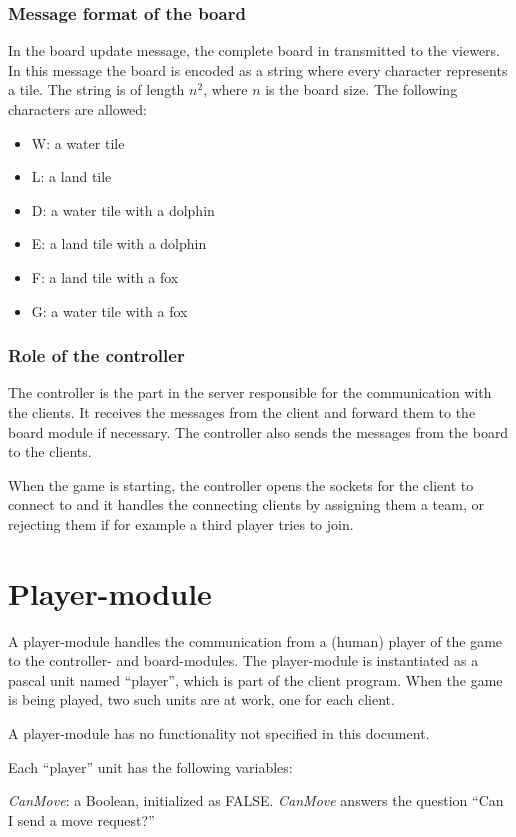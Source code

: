 \documentclass[a4paper,twoside,11pt]{book}
\begin{document}
\subsection{Message format of the board}
\label{serialboardformat}
In the board update message, the complete board in transmitted to the viewers. In this message the board is encoded as a string where every character represents a tile. The string is of length $n^2$, where $n$ is the board size. The following characters are allowed:
\begin{itemize}
\item W: a water tile
\item L: a land tile
\item D: a water tile with a dolphin
\item E: a land tile with a dolphin
\item F: a land tile with a fox
\item G: a water tile with a fox
\end{itemize}

\subsection{Role of the controller}
The controller is the part in the server responsible for the communication with the clients. It receives the messages from the client and forward them to the board module if necessary. The controller also sends the messages from the board to the clients.

When the game is starting, the controller opens the sockets for the client to connect to and it handles the connecting clients by assigning them a team, or rejecting them if for example a third player tries to join.

\chapter{Player-module}
A player-module handles the communication from a (human) player of the game to the controller- and board-modules. The player-module is instantiated as a pascal unit named ``player'', which is part of the client program. When the game is being played, two such units are at work, one for each client.

A player-module has no functionality not specified in this document.

Each ``player'' unit has the following variables:

\emph{CanMove}: a Boolean, initialized as FALSE. \emph{CanMove} answers the question ``Can I send a move request?''
\end{document}

